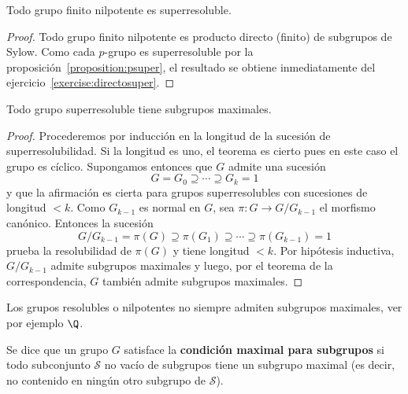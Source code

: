 \begin{corollary}
	Todo grupo finito nilpotente es superresoluble.
\end{corollary}

\begin{proof}
	Todo grupo finito nilpotente es producto directo (finito) de subgrupos de
	Sylow. Como cada $p$-grupo es superresoluble por la
	proposición~\ref{proposition:psuper}, el resultado se obtiene
	inmediatamente del ejercicio~\ref{exercise:directosuper}.
\end{proof}

\begin{theorem}
	Todo grupo superresoluble tiene subgrupos maximales.	
\end{theorem}

\begin{proof}
	Procederemos por inducción en la longitud de la sucesión de
	superresolubilidad. Si la longitud es uno, el teorema es cierto pues en
	este caso el grupo es cíclico. Supongamos entonces que $G$ admite una
	sucesión
	\[
		G=G_0\supseteq\cdots\supseteq G_k=1
	\]
	y que la afirmación es cierta para grupos superresolubles con sucesiones 
	de longitud $<k$. Como $G_{k-1}$ es normal en $G$, sea $\pi\colon G\to
	G/G_{k-1}$ el morfismo canónico. Entonces la sucesión
	\[
		G/G_{k-1}=\pi(G)\supseteq \pi(G_1)\supseteq\cdots\supseteq\pi(G_{k-1})=1
	\]
	prueba la resolubilidad de $\pi(G)$ y tiene longitud $<k$. Por hipótesis
	inductiva, $G/G_{k-1}$ admite subgrupos maximales y luego, por el teorema
	de la correspondencia, $G$ también admite subgrupos maximales.
\end{proof}

\begin{example}
	Los grupos resolubles o nilpotentes no siempre admiten
	subgrupos maximales, ver por ejemplo $\Q$.
\end{example}

\begin{definition}
	Se dice que un grupo $G$ satisface la \textbf{condición maximal para
	subgrupos} si 
	todo subconjunto $\mathcal{S}$ no vacío de subgrupos tiene un subgrupo
	maximal (es decir, no contenido en ningún otro subgrupo de $\mathcal{S}$). 
\end{definition}

